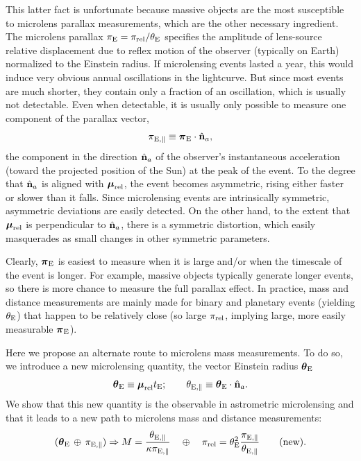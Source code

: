 \documentclass[12pt,preprint]{aastex}
\newcommand{\bdv}[1]{\mbox{\boldmath$#1$}}
\def\rel{{\rm rel}}
\def\e{{\rm E}}
\def\bpi{{\bdv\pi}}
\def\bmu{{\bdv\mu}}
\def\btheta{{\bdv\theta}}
\begin{document}
This latter fact is unfortunate because massive objects are the most
susceptible to microlens parallax measurements, which are the other
necessary ingredient.  The microlens parallax $\pi_\e=\pi_\rel/\theta_\e$
specifies the amplitude of lens-source relative displacement due
to reflex motion of the observer (typically on Earth) 
normalized to the Einstein radius.
If microlensing events lasted a year, this would induce very obvious annual
oscillations in the lightcurve.  But since most events are much shorter,
they contain only a fraction of an oscillation, which is usually
not detectable.  Even when detectable, it is usually only possible
to measure one component of the parallax vector, 
\begin{equation}
\pi_{\e,\parallel} \equiv \bpi_\e\cdot \hat{\bf n}_a,
\label{eqn:piepar}
\end{equation}
the component in the direction $\hat{\bf n}_a$ of the observer's
instantaneous acceleration (toward the projected position of the Sun)
at the peak of the event.  To the degree that $\hat{\bf n}_a$  is aligned
with $\bmu_\rel$, the event becomes asymmetric, rising
either faster or slower than it falls.  Since microlensing events
are intrinsically symmetric, asymmetric deviations are easily detected.
On the other hand, to the extent that $\bmu_\rel$ is perpendicular to
$\hat{\bf n}_a$, there is a symmetric distortion, which easily
masquerades as small changes in other symmetric parameters.  

Clearly, $\bpi_\e$ is easiest to measure when it is large and/or when
the timescale of the event is longer.  For example, massive objects
typically generate longer events, so there is more chance to measure
the full parallax effect. In practice,
mass and distance measurements are mainly made
for binary and planetary events (yielding $\theta_\e$) that happen
to be relatively close (so large $\pi_\rel$, implying large, more easily
measurable $\bpi_\e$).

Here we propose an alternate route to microlens mass measurements.
To do so, we introduce a new microlensing quantity, the vector Einstein
radius $\btheta_\e$
\begin{equation}
\btheta_\e\equiv \bmu_\rel t_\e;
\qquad \theta_{\e,\parallel} \equiv \btheta_\e\cdot \hat{\bf n}_a.
\label{eqn:btedef}
\end{equation}
We show that this new quantity is the observable in astrometric
microlensing and that it leads to a new path to microlens mass and distance
measurements:
\begin{equation}
(\btheta_\e\,\oplus\,\pi_{\e,\parallel})
\Rightarrow M = {\theta_{\e,\parallel}\over\kappa\pi_{\e,\parallel}}
\quad \oplus \quad \pi_\rel=\theta_\e^2{\pi_{\e,\parallel}\over\theta_{\e,\parallel}}
\qquad {\rm (new)}.
\label{eqn:mdeval2}
\end{equation}
\end{document}
